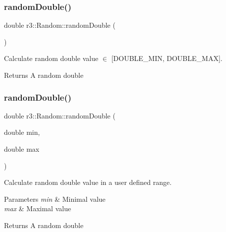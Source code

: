 \subsubsection{\texorpdfstring{random\+Double()}{randomDouble()}\hspace{0.1cm}{\footnotesize\ttfamily [1/2]}}
{\footnotesize\ttfamily double r3\+::\+Random\+::random\+Double (\begin{DoxyParamCaption}{ }\end{DoxyParamCaption})\hspace{0.3cm}{\ttfamily [static]}}



Calculate random double value $\in$ \mbox{[}D\+O\+U\+B\+L\+E\+\_\+\+M\+IN, D\+O\+U\+B\+L\+E\+\_\+\+M\+AX\mbox{]}. 

\begin{DoxyReturn}{Returns}
A random double 
\end{DoxyReturn}
\mbox{\label{classr3_1_1_random_a059b209f1eb1f46a8a9101ada359b028}} 
\subsubsection{\texorpdfstring{random\+Double()}{randomDouble()}\hspace{0.1cm}{\footnotesize\ttfamily [2/2]}}
{\footnotesize\ttfamily double r3\+::\+Random\+::random\+Double (\begin{DoxyParamCaption}\item[{double}]{min,  }\item[{double}]{max }\end{DoxyParamCaption})\hspace{0.3cm}{\ttfamily [static]}}



Calculate random double value in a user defined range. 


\begin{DoxyParams}{Parameters}
{\em min} & Minimal value \\
\hline
{\em max} & Maximal value \\
\hline
\end{DoxyParams}
\begin{DoxyReturn}{Returns}
A random double 
\end{DoxyReturn}
\mbox{\label{classr3_1_1_random_a04e1db517c98c2ea6b75b7dfe8466ded}} 
